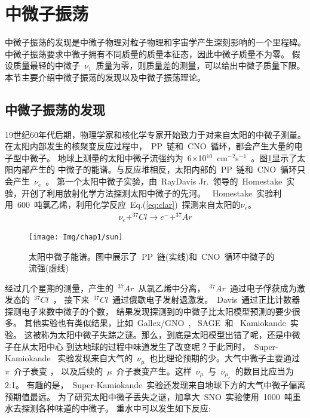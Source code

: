 \section{中微子振荡}
中微子振荡的发现是中微子物理对粒子物理和宇宙学产生深刻影响的一个里程碑。
中微子振荡要求中微子拥有不同质量的质量本征态，因此中微子质量不为零。
假设质量最轻的中微子~$\nu_1$~质量为零，则质量差的测量，可以给出中微子质量下限。
本节主要介绍中微子振荡的发现以及中微子振荡理论。
\subsection{中微子振荡的发现}
19世纪60年代后期，物理学家和核化学专家开始致力于对来自太阳的中微子测量。
在太阳内部发生的核聚变反应过程中，~PP~链和~CNO~循环，都会产生大量的电子型中微子\citep{bahcall2005new}。
地球上测量的太阳中微子流强约为~6$\times$10$^{10}$~cm$^{-2}$s$^{-1}$~。图\ref{fig:sun}显示了太阳内部产生的
中微子的能谱。与反应堆相反，太阳内部的~PP~链和~CNO~循环只会产生~$\nu_e$~。
第一个太阳中微子实验，由~RayDavis Jr.~领导的~Homestake~实验，开创了利用放射化学方法探测太阳中微子的先河。
~Homestake~实验利用~600~吨氯乙烯，利用化学反应~Eq.(\ref{eq:clar})~探测来自太阳的$\nu_e$。
\begin{eqnarray}\label{eq:clar}
\nu_e + ^{37}Cl \rightarrow e^- + ^{37}Ar
\end{eqnarray}
\begin{figure}[!htbp]
  \centering
   \texttt{[image: Img/chap1/sun]}
    \caption{太阳中微子能谱。图中展示了~PP~链(实线)和~CNO~循环中微子的流强(虚线)}
  \label{fig:sun}
\end{figure}
经过几个星期的测量，产生的~$^{37}Ar$~从氯乙烯中分离，~$^{37}Ar$~通过电子俘获成为激发态的~$^{37}Cl$~，
接下来~$^{37}Cl$~通过俄歇电子发射退激发。~Davis~通过正比计数器探测电子来数中微子的个数，
结果发现探测到的中微子比太阳模型预测的要少很多。
其他实验也有类似结果，比如~Gallex/GNO~, ~SAGE~\citep{abdurashitov1994results}和
~Kamiokande~\citep{PhysRevLett.63.16,PhysRevD.44.2241}实验。
这被称为太阳中微子失踪之谜。那么，到底是太阳模型出错了呢，还是中微子在从太阳中心
到达地球的过程中味道发生了改变呢？于此同时，~Super-Kamiokande~\citep{fukuda1998measurement}
实验发现来自大气的~$\nu_{\mu}$~也比理论预期的少。大气中微子主要通过~$\pi$~介子衰变 ，
以及后续的~$\mu$~介子衰变产生。这样~$\nu_{\mu}$~与~$\nu_{\mu_e}$~的数目比应当为2:1。
有趣的是，~Super-Kamiokande~实验还发现来自地球下方的大气中微子偏离预期值最远\citep{PhysRevLett.82.2644}。
为了研究太阳中微子丢失之谜，加拿大~SNO~实验\citep{mcdonald1999sudbury}使用~1000~吨重水去探测各种味道的中微子。
重水中可以发生如下反应:
